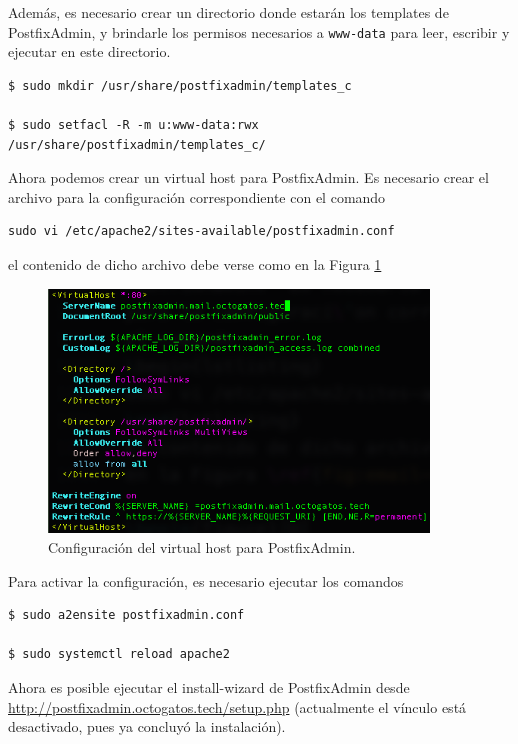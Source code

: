 \documentclass{article}
\newcommand{\ttt}[1]{%
\texttt{#1}%
}
\begin{document}
Adem\'as, es necesario crear un directorio
donde estar\'an los templates de PostfixAdmin,
y brindarle los permisos necesarios a
\ttt{www-data} para leer, escribir y ejecutar
en este directorio.
\begin{lstlisting}
$ sudo mkdir /usr/share/postfixadmin/templates_c

$ sudo setfacl -R -m u:www-data:rwx /usr/share/postfixadmin/templates_c/
\end{lstlisting}

Ahora podemos crear un virtual host para
PostfixAdmin.  Es necesario crear el archivo
para la configuraci\'on correspondiente con
el comando
\begin{lstlisting}
sudo vi /etc/apache2/sites-available/postfixadmin.conf
\end{lstlisting}
el contenido de dicho archivo debe verse como
en la Figura \ref{fig:email-vhost}

\begin{figure}[H]
  \centering
  \includegraphics[width=0.9\textwidth]{email/vhost}
  \caption{Configuraci\'on del virtual host para PostfixAdmin.}
  \label{fig:email-vhost}
\end{figure}

Para activar la configuraci\'on, es necesario
ejecutar los comandos
\begin{lstlisting}
$ sudo a2ensite postfixadmin.conf

$ sudo systemctl reload apache2
\end{lstlisting}

Ahora es posible ejecutar el install-wizard de
PostfixAdmin desde \href{http://postfixadmin.octogatos.tech/setup.php}{http://postfixadmin.octogatos.tech/setup.php}
(actualmente el v\'inculo est\'a desactivado, pues
ya concluy\'o la instalaci\'on).
\end{document}
